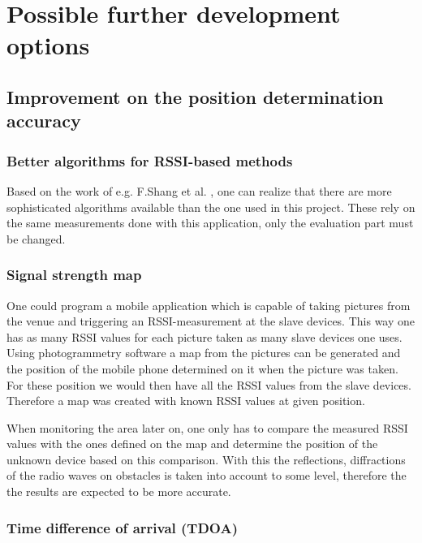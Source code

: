 \documentclass[11pt,a4paper]{article}
\begin{document}
\newpage


\section{Possible further development options}

\subsection{Improvement on the position determination accuracy}

\subsubsection{Better algorithms for RSSI-based methods}

Based on the work of e.g. F.Shang et al. \cite{Shang}, one can realize that there are more sophisticated algorithms available than the one used in this project. These rely on the same measurements done with this application, only the evaluation part must be changed.

\subsubsection{Signal strength map}

One could program a mobile application which is capable of taking pictures from the venue and triggering an RSSI-measurement at the slave devices. This way one has as many RSSI values for each picture taken as many slave devices one uses. Using photogrammetry software a map from the pictures can be generated and the position of the mobile phone determined on it when the picture was taken. For these position we would then have all the RSSI values from the slave devices. Therefore a map was created with known RSSI values at given position.

When monitoring the area later on, one only has to compare the measured RSSI values with the ones defined on the map and determine the position of the unknown device based on this comparison. With this the reflections, diffractions of the radio waves on obstacles is taken into account to some level, therefore the the results are expected to be more accurate.

\subsubsection{Time difference of arrival (TDOA)}
\end{document}
